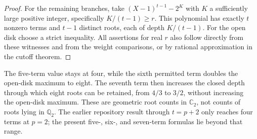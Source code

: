 \begin{proof}
For the remaining branches, take $(X-1)^{t-1}-2^K$ with $K$ a sufficiently
large positive integer, specifically $K/(t-1)\ge r$. This polynomial has
exactly $t$ nonzero terms and $t-1$ distinct roots, each of depth
$K/(t-1)$. For the open disk choose a strict inequality. All assertions
for real $r$ also follow directly from these witnesses and from the
weight comparisons, or by rational approximation in the cutoff theorem.
\end{proof}

The five-term value stays at four, while the sixth permitted term doubles
the open-disk maximum to eight. The seventh term then increases the
closed depth through which eight roots can be retained, from $4/3$ to
$3/2$, without increasing the open-disk maximum. These are geometric
root counts in $\mathbb C_2$, not counts of roots lying in $\mathbb Q_2$.
The earlier repository result through $t=p+2$ only reaches four terms
at $p=2$; the present five-, six-, and seven-term formulas lie beyond
that range.

